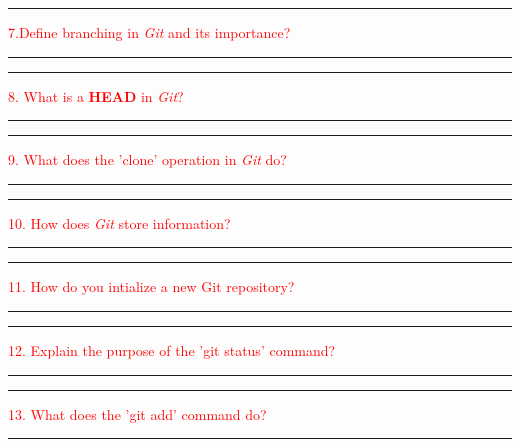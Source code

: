 \documentclass{article}
\begin{document}
\noindent
{\color{red} \rule{\linewidth}{0.5mm}}
\textcolor{red}{7.Define branching in \textit{Git} and its importance?} \\
\noindent
{\color{red} \rule{\linewidth}{0.5mm}}



\noindent
{\color{red} \rule{\linewidth}{0.5mm}}
\textcolor{red}{8. What is a \textbf{HEAD} in \textit{Git}?} \\
\noindent
{\color{red} \rule{\linewidth}{0.5mm}}

\noindent
{\color{red} \rule{\linewidth}{0.5mm}}
\textcolor{red}{9. What does the 'clone' operation in \textit{Git} do?} \\
\noindent
{\color{red} \rule{\linewidth}{0.5mm}}

\noindent
{\color{red} \rule{\linewidth}{0.5mm}}
\textcolor{red}{10. How does \textit{Git} store information?} \\
\noindent
{\color{red} \rule{\linewidth}{0.5mm}}


\noindent
{\color{red} \rule{\linewidth}{0.5mm}}
\textcolor{red}{11. How do you intialize a new Git repository?} \\
\noindent
{\color{red} \rule{\linewidth}{0.5mm}}

\noindent
{\color{red} \rule{\linewidth}{0.5mm}}
\textcolor{red}{12. Explain the purpose of the 'git status' command?} \\
\noindent
{\color{red} \rule{\linewidth}{0.5mm}}


\noindent
{\color{red} \rule{\linewidth}{0.5mm}}
\textcolor{red}{13. What does the 'git add' command do?} \\
\noindent
{\color{red} \rule{\linewidth}{0.5mm}}
\end{document}
